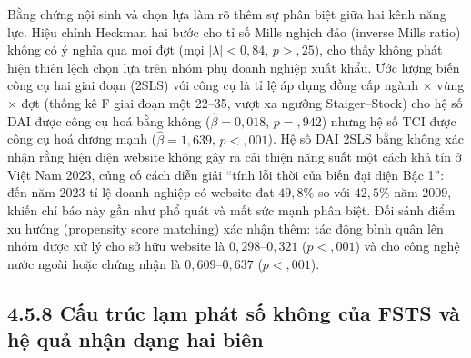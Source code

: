 \documentclass[
  a4paper,
  13pt]{extreport}
\begin{document}
Bằng chứng nội sinh và chọn lựa làm rõ thêm sự phân biệt giữa hai kênh
năng lực. Hiệu chỉnh Heckman hai bước cho tỉ số Mills nghịch đảo
(inverse Mills ratio) không có ý nghĩa qua mọi đợt (mọi
\(|\lambda| < 0{,}84\), \(p > {,}25\)), cho thấy không phát hiện thiên
lệch chọn lựa trên nhóm phụ doanh nghiệp xuất khẩu. Ước lượng biến công
cụ hai giai đoạn (2SLS) với công cụ là tỉ lệ áp dụng đồng cấp ngành ×
vùng × đợt (thống kê F giai đoạn một 22--35, vượt xa ngưỡng
Staiger--Stock) cho hệ số DAI được công cụ hoá bằng không
(\(\hat{\beta} = 0{,}018\), \(p = {,}942\)) nhưng hệ số TCI được công cụ
hoá dương mạnh (\(\hat{\beta} = 1{,}639\), \(p < {,}001\)). Hệ số DAI
2SLS bằng không xác nhận rằng hiện diện website không gây ra cải thiện
năng suất một cách khả tín ở Việt Nam 2023, củng cố cách diễn giải
``tính lỗi thời của biến đại diện Bậc 1'': đến năm 2023 tỉ lệ doanh
nghiệp có website đạt \(49{,}8\%\) so với \(42{,}5\%\) năm 2009, khiến
chỉ báo này gần như phổ quát và mất sức mạnh phân biệt. Đối sánh điểm xu
hướng (propensity score matching) xác nhận thêm: tác động bình quân lên
nhóm được xử lý cho sở hữu website là \(0{,}298\)--\(0{,}321\)
(\(p < {,}001\)) và cho công nghệ nước ngoài hoặc chứng nhận là
\(0{,}609\)--\(0{,}637\) (\(p < {,}001\)).

\hypertarget{cux1ea5u-truxfac-lux1ea1m-phuxe1t-sux1ed1-khuxf4ng-cux1ee7a-fsts-vuxe0-hux1ec7-quux1ea3-nhux1eadn-dux1ea1ng-hai-biuxean}{%
\subsection{4.5.8 Cấu trúc lạm phát số không của FSTS và hệ quả nhận
dạng hai
biên}\label{cux1ea5u-truxfac-lux1ea1m-phuxe1t-sux1ed1-khuxf4ng-cux1ee7a-fsts-vuxe0-hux1ec7-quux1ea3-nhux1eadn-dux1ea1ng-hai-biuxean}}
\end{document}
